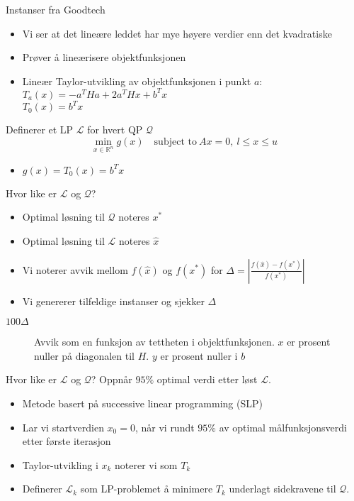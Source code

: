 \documentclass{beamer}
\begin{document}
\begin{frame}{Instanser fra Goodtech}
\begin{itemize}
\item Vi ser at det lineære leddet har mye høyere verdier enn det kvadratiske
\item Prøver å lineærisere objektfunksjonen
\item Lineær Taylor-utvikling av objektfunksjonen i punkt $a$: \\
      $T_a(x) = -a^T H a + 2a^T H x + b^T x$ \\
      $T_0(x) = b^T x$
\end{itemize}
Definerer et LP $\mathcal{L}$ for hvert QP $\mathcal{Q}$
\[
\min_{x \in \mathbb{R}^n} g(x) \quad \textrm{subject to} ~ Ax = 0, ~ l \leq x \leq u
\]
\begin{itemize}
\item $g(x) = T_0(x) = b^T x$
\end{itemize}
\end{frame}



\begin{frame}{Hvor like er $\mathcal{L}$ og $\mathcal{Q}$?}
\begin{itemize}
\item Optimal løsning til $\mathcal{Q}$ noteres $x^*$
\item Optimal løsning til $\mathcal{L}$ noteres $\hat{x}$
\item Vi noterer avvik mellom $f(\hat{x})$ og $f(x^*)$ for
      $\Delta = \left| \frac{f(\hat{x}) - f(x^*)}{f(x^*)} \right|$
\item Vi genererer tilfeldige instanser og sjekker $\Delta$
\end{itemize}
\end{frame}



\begin{frame}{$100\Delta$}
\begin{figure}[ht!]

\caption{Avvik som en funksjon av tettheten i objektfunksjonen. $x$ er prosent
         nuller på diagonalen til $H$. $y$ er prosent nuller i $b$}
\end{figure}
\end{frame}



\begin{frame}{Hvor like er $\mathcal{L}$ og $\mathcal{Q}$?}
Oppnår $95\%$ optimal verdi etter løst $\mathcal{L}$.
\begin{itemize}
\item Metode basert på successive linear programming (SLP)
\item Lar vi startverdien $x_0 = 0$, når vi rundt $95\%$ av optimal målfunksjonsverdi etter
      første iterasjon
\item Taylor-utvikling i $x_k$ noterer vi som $T_k$
\item Definerer $\mathcal{L}_k$ som LP-problemet å minimere $T_k$ underlagt
      sidekravene til $\mathcal{Q}$.
\end{itemize}
\end{frame}
\end{document}
